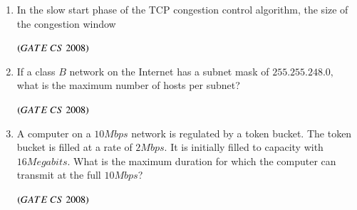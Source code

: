 \documentclass[journal]{IEEEtran}
\numberwithin{equation}{enumi}
\numberwithin{figure}{enumi}
\begin{document}
\begin{enumerate}
\item In the slow start phase of the TCP congestion control algorithm, the size of the congestion window
\begin{enumerate} 
\end{enumerate}
\hfill $\left(GATE\ CS\  2008\right)$

\item If a class $B$ network on the Internet has a subnet mask of $255.255.248.0,$ what is the maximum number of hosts per subnet? 
\begin{enumerate} 
\end{enumerate}
\hfill $\left(GATE\ CS\  2008\right)$

\item A computer on a $10Mbps$ network is regulated by a token bucket. The token bucket is filled at a rate of $2Mbps$. It is initially filled to capacity with $16Megabits$. What is the maximum duration for which the computer can transmit at the full $10Mbps$? 
\begin{enumerate} 
\end{enumerate}
\hfill $\left(GATE\ CS\  2008\right)$


\end{enumerate}
\end{document}
